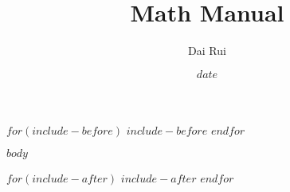 \documentclass{article}
\title{Math Manual}     \let\Title\@title
\author{Dai Rui}        \let\Author\@author
\date{$date$}
\begin{document}
$for(include-before)$  %
$include-before$
$endfor$

$body$

$for(include-after)$
$include-after$
$endfor$
\end{document}
